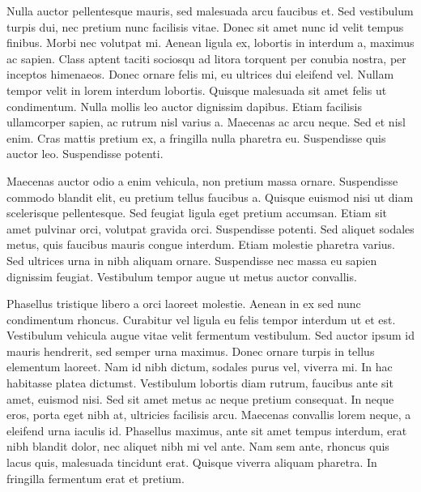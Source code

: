 \documentclass{homework}
\begin{document}
Nulla auctor pellentesque mauris, sed malesuada arcu faucibus et. Sed vestibulum turpis dui, nec pretium nunc facilisis vitae. Donec sit amet nunc id velit tempus finibus. Morbi nec volutpat mi. Aenean ligula ex, lobortis in interdum a, maximus ac sapien. Class aptent taciti sociosqu ad litora torquent per conubia nostra, per inceptos himenaeos. Donec ornare felis mi, eu ultrices dui eleifend vel. Nullam tempor velit in lorem interdum lobortis. Quisque malesuada sit amet felis ut condimentum. Nulla mollis leo auctor dignissim dapibus. Etiam facilisis ullamcorper sapien, ac rutrum nisl varius a. Maecenas ac arcu neque. Sed et nisl enim. Cras mattis pretium ex, a fringilla nulla pharetra eu. Suspendisse quis auctor leo. Suspendisse potenti.

Maecenas auctor odio a enim vehicula, non pretium massa ornare. Suspendisse commodo blandit elit, eu pretium tellus faucibus a. Quisque euismod nisi ut diam scelerisque pellentesque. Sed feugiat ligula eget pretium accumsan. Etiam sit amet pulvinar orci, volutpat gravida orci. Suspendisse potenti. Sed aliquet sodales metus, quis faucibus mauris congue interdum. Etiam molestie pharetra varius. Sed ultrices urna in nibh aliquam ornare. Suspendisse nec massa eu sapien dignissim feugiat. Vestibulum tempor augue ut metus auctor convallis.

Phasellus tristique libero a orci laoreet molestie. Aenean in ex sed nunc condimentum rhoncus. Curabitur vel ligula eu felis tempor interdum ut et est. Vestibulum vehicula augue vitae velit fermentum vestibulum. Sed auctor ipsum id mauris hendrerit, sed semper urna maximus. Donec ornare turpis in tellus elementum laoreet. Nam id nibh dictum, sodales purus vel, viverra mi. In hac habitasse platea dictumst. Vestibulum lobortis diam rutrum, faucibus ante sit amet, euismod nisi. Sed sit amet metus ac neque pretium consequat. In neque eros, porta eget nibh at, ultricies facilisis arcu. Maecenas convallis lorem neque, a eleifend urna iaculis id. Phasellus maximus, ante sit amet tempus interdum, erat nibh blandit dolor, nec aliquet nibh mi vel ante. Nam sem ante, rhoncus quis lacus quis, malesuada tincidunt erat. Quisque viverra aliquam pharetra. In fringilla fermentum erat et pretium.
\end{document}
